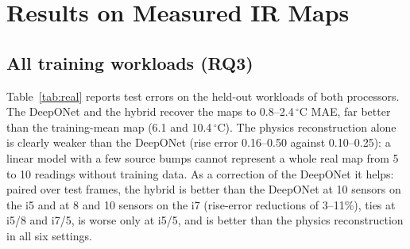 \documentclass[journal]{IEEEtran}
\begin{document}
\section{Results on Measured IR Maps}\label{sec:real}

\subsection{All training workloads (RQ3)}
Table~\ref{tab:real} reports test errors on the held-out workloads of both processors.
The DeepONet and the hybrid recover the maps to 0.8--2.4\,$^\circ$C MAE, far better than the training-mean map (6.1 and 10.4\,$^\circ$C).
The physics reconstruction alone is clearly weaker than the DeepONet (rise error 0.16--0.50 against 0.10--0.25): a linear model with a few source bumps cannot represent a whole real map from 5 to 10 readings without training data.
As a correction of the DeepONet it helps: paired over test frames, the hybrid is better than the DeepONet at 10 sensors on the i5 and at 8 and 10 sensors on the i7 (rise-error reductions of 3--11\%), ties at i5/8 and i7/5, is worse only at i5/5, and is better than the physics reconstruction in all six settings.
\end{document}
